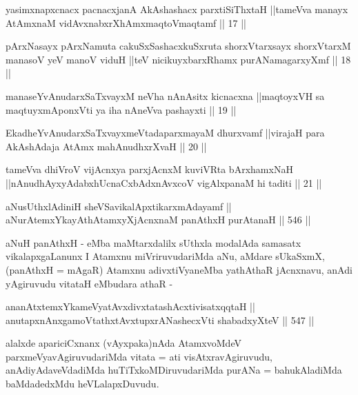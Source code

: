 \begin{kandikeshl}
yasimxnapxcnacx pacnacxjanA AkAshashacx parxtiSiThxtaH ||tameVva manayx AtAmxnaM vidAvxnabxrXhAmxmaqtoV\s maqtamf || 17 ||
\end{kandikeshl}

\begin{kandikeshl}
pArxNasayx pArxNamuta cakuSxSashacxkuSxruta shorxVtarxsayx shorxVtarxM manasoV yeV manoV viduH ||teV nicikuyxbarxRhamx purANamagarxyXmf || 18 ||
\end{kandikeshl}

\begin{kandikeshl}
manaseYvAnudarxSaTxvayxM neVha nAnAsitx kicnacxna ||maqtoyxVH sa maqtuyxmAponxVti ya iha nAneVva pashayxti || 19 ||
\end{kandikeshl}

\begin{kandikeshl}
EkadheYvAnudarxSaTxvayxmeVtadaparxmayaM dhurxvamf ||virajaH para AkAshAdaja AtAmx mahAnudhxrXvaH || 20 ||
\end{kandikeshl}

\begin{kandikeshl}
tameVva dhiVroV vijAcnxya parxjAcnxM kuviVRta bArxhamxNaH ||nAnudhAyxyAdabxhUcnaCxbAdxnAvxcoV vigAlxpanaM hi taditi || 21 ||
\end{kandikeshl}



\begin{shl}
aNusUthxlAdiniH sheVSavikalApxtikarxmAdayamf || \\
aNurAtemxYkayAthAtamxyXjAcnxnaM panAthxH purAtanaH \hfill || 546 ||  
\end{shl}

\begin{artha}
aNuH panAthxH - eMba maMtarxdalilx sUthxla modalAda samasatx
vikalapxgaLanunx I Atamxnu miVriruvudariMda aNu, aMdare sUkaSxmX,
(panAthxH = mAgaR) Atamxnu adivxtiVyaneMba yathAthaR jAcnxnavu, anAdi
yAgiruvudu vitataH eMbudara athaR -
\end{artha}

\begin{shl}
ananAtxtemxYkameVyatAvxdivxtatashAcxtivisatxqqtaH || \\
anutapxnAnxgamoVtathxtAvxtupxrANashecxVti shabadxyXteV \hfill || 547 ||  
\end{shl}

\begin{artha}
alalxde apariciCxnanx (vAyxpaka)nAda AtamxvoMdeV
parxmeVyavAgiruvudariMda vitata = ati visAtxravAgiruvudu,
anAdiyAdaveVdadiMda huTiTxkoMDiruvudariMda purANa = bahukAladiMda
baMdadedxMdu heVLalapxDuvudu.
\end{artha}

